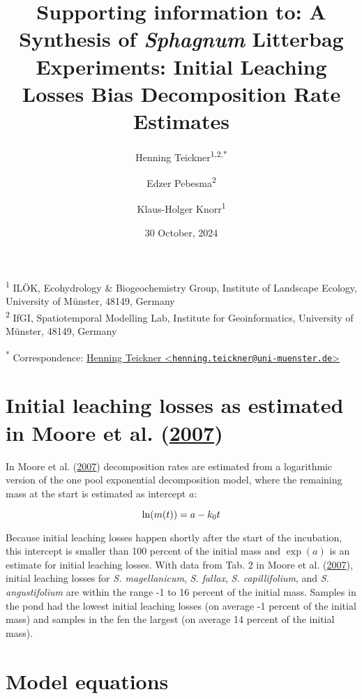 \documentclass[
  12pt,
]{article}
\title{Supporting information to: A Synthesis of \emph{Sphagnum} Litterbag Experiments: Initial Leaching Losses Bias Decomposition Rate Estimates}
\author{Henning Teickner\textsuperscript{1,2,*} \and Edzer Pebesma\textsuperscript{2} \and Klaus-Holger Knorr\textsuperscript{1}}
\date{30 October, 2024}
\begin{document}
\maketitle

{
\setcounter{tocdepth}{2}
\tableofcontents
}
\textsuperscript{1} ILÖK, Ecohydrology \& Biogeochemistry Group, Institute of Landscape Ecology, University of Münster, 48149, Germany\\
\textsuperscript{2} IfGI, Spatiotemporal Modelling Lab, Institute for Geoinformatics, University of Münster, 48149, Germany

\textsuperscript{*} Correspondence: \href{mailto:henning.teickner@uni-muenster.de}{Henning Teickner \textless{}\href{mailto:henning.teickner@uni-muenster.de}{\nolinkurl{henning.teickner@uni-muenster.de}}\textgreater{}}

\renewcommand{\thefigure}{S\arabic{figure}} 
\renewcommand{\thetable}{S\arabic{table}}
\renewcommand{\thesection}{S\arabic{section}}
\renewcommand{\theequation}{S\arabic{equation}}

\hypertarget{sup-1}{%
\section{\texorpdfstring{Initial leaching losses as estimated in Moore et al. (\protect\hyperlink{ref-Moore.2007}{2007})}{Initial leaching losses as estimated in Moore et al. (2007)}}\label{sup-1}}

In Moore et al. (\protect\hyperlink{ref-Moore.2007}{2007}) decomposition rates are estimated from a logarithmic version of the one pool exponential decomposition model, where the remaining mass at the start is estimated as intercept \(a\):

\[
\ln(m(t)) = a - k_0t\\
\]

Because initial leaching losses happen shortly after the start of the incubation, this intercept is smaller than 100 percent of the initial mass and \(\exp(a)\) is an estimate for initial leaching losses. With data from Tab. 2 in Moore et al. (\protect\hyperlink{ref-Moore.2007}{2007}), initial leaching losses for \emph{S. magellanicum}, \emph{S. fallax}, \emph{S. capillifolium}, and \emph{S. angustifolium} are within the range -1 to 16 percent of the initial mass. Samples in the pond had the lowest initial leaching losses (on average -1 percent of the initial mass) and samples in the fen the largest (on average 14 percent of the initial mass).

\hypertarget{sup-13}{%
\section{Model equations}\label{sup-13}}
\end{document}
